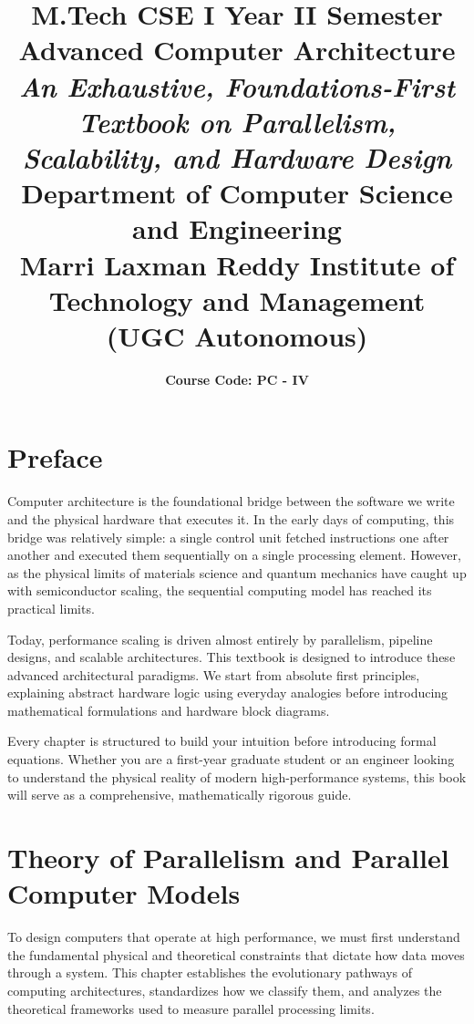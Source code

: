 \documentclass[12pt,a4paper,openany]{book}
\title{
    \large\textbf{M.Tech CSE I Year II Semester}\\[1cm]
    \Huge\textbf{Advanced Computer Architecture}\\
    \large\textit{An Exhaustive, Foundations-First Textbook on Parallelism, Scalability, and Hardware Design}\\[1.5cm]
    \large\textbf{Department of Computer Science and Engineering}\\
    \large{Marri Laxman Reddy Institute of Technology and Management}\\
    \small{(UGC Autonomous)}
}
\author{\textbf{Course Code: PC - IV}}
\date{}
\begin{document}
\maketitle
\tableofcontents

\chapter*{Preface}

Computer architecture is the foundational bridge between the software we write and the physical hardware that executes it. In the early days of computing, this bridge was relatively simple: a single control unit fetched instructions one after another and executed them sequentially on a single processing element. However, as the physical limits of materials science and quantum mechanics have caught up with semiconductor scaling, the sequential computing model has reached its practical limits.

Today, performance scaling is driven almost entirely by parallelism, pipeline designs, and scalable architectures. This textbook is designed to introduce these advanced architectural paradigms. We start from absolute first principles, explaining abstract hardware logic using everyday analogies before introducing mathematical formulations and hardware block diagrams.

Every chapter is structured to build your intuition before introducing formal equations. Whether you are a first-year graduate student or an engineer looking to understand the physical reality of modern high-performance systems, this book will serve as a comprehensive, mathematically rigorous guide.
\chapter[Theory of Parallelism and Parallel Models]{Theory of Parallelism and Parallel Computer Models}

To design computers that operate at high performance, we must first understand the fundamental physical and theoretical constraints that dictate how data moves through a system. This chapter establishes the evolutionary pathways of computing architectures, standardizes how we classify them, and analyzes the theoretical frameworks used to measure parallel processing limits.
\end{document}
